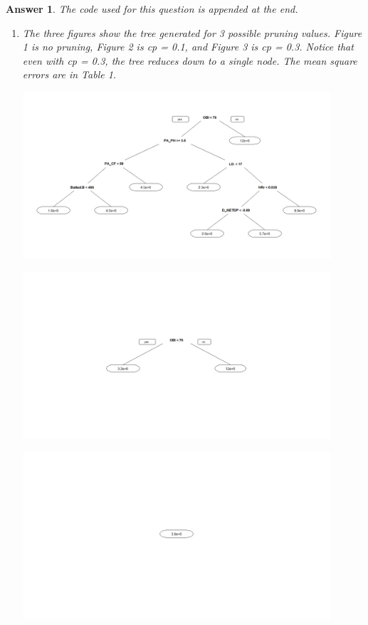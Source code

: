 \documentclass[12pt]{article}
\theoremstyle{colon}
\newtheorem*{answer}{Answer}
\begin{document}
\begin{answer}
  The code used for this question is appended at the end.

  \begin{enumerate}[label=\alph*)]
    \item The three figures show the tree generated for 3 possible pruning values. Figure 1 is no pruning, Figure 2 is cp = 0.1, and Figure 3 is cp = 0.3. Notice that even with cp = 0.3, the tree reduces down to a single node. The mean square errors are in Table 1.
      \begin{center}
        \includegraphics[width=0.9\textwidth]{question1a_no_prune.jpeg}
      \end{center}

      \begin{center}
        \includegraphics[width=0.9\textwidth]{question1a_0_1.jpeg}
      \end{center}

      \begin{center}
        \includegraphics[width=0.9\textwidth]{question1a_0_3.jpeg}
      \end{center}


\end{enumerate}
\end{answer}
\end{document}
